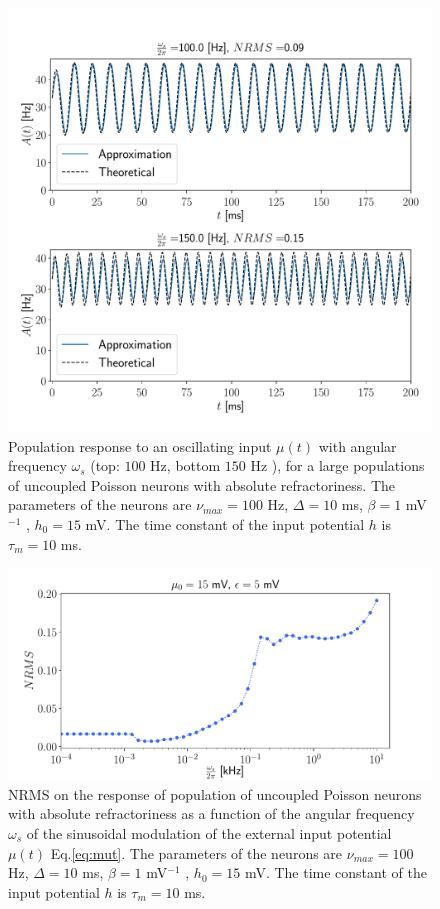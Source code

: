 \documentclass[12pt,twoside]{report}
\begin{document}
\begin{figure}[h!]
	\centering
	\includegraphics[width=0.8\linewidth]{A_omega_t.pdf}
	\caption{Population response to an oscillating input $\mu(t)$ with angular frequency $\omega_s$ (top: $100$ Hz, bottom $150$ Hz ), for a large populations of uncoupled Poisson neurons with absolute refractoriness. The parameters of the neurons are $\nu_{max}=100$ Hz, $\Delta=10$ ms, $\beta=1$ mV$^{-1}$ , $h_0=15$ mV. The time constant of the input potential $h$ is $\tau_m=10$ ms.
	}
	\label{fig:A_omega_t}
\end{figure}


\begin{figure}[h!]
	\centering
	\includegraphics[width=0.8\linewidth]{NRMSo.pdf}
	\caption{NRMS on the response of population of uncoupled Poisson neurons with absolute refractoriness as a function of the angular frequency $\omega_s$  of the sinusoidal modulation of the external input potential $\mu(t)$ Eq.\eqref{eq:mut}. The parameters of the neurons are $\nu_{max}=100$ Hz, $\Delta=10$ ms, $\beta=1$ mV$^{-1}$ , $h_0=15$ mV. The time constant of the input potential $h$ is $\tau_m=10$ ms.
	}
	\label{fig:NRMSo}
\end{figure}
\end{document}
